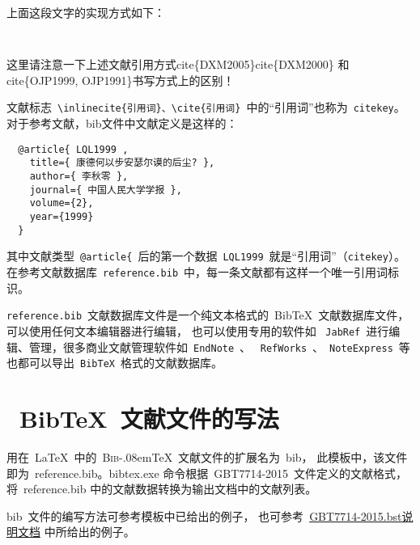 上面这段文字的实现方式如下：

\texttt{
}

这里请注意一下上述文献引用方式\cite{DXM2005}\cite{DXM2000}\cs cite\{DXM2005\}\cs cite\{DXM2000\}
和\cite{OJP1999,OJP1991}\cs cite\{OJP1999, OJP1991\}书写方式上的区别！

文献标志~\verb|\inlinecite{引用词}、\cite{引用词}|~中的“引用词”也称为~\verb|citekey|。
对于参考文献，bib文件中文献定义是这样的：
\begin{lstlisting}
  @article{ LQL1999 ,
    title={ 康德何以步安瑟尔谟的后尘? },
    author={ 李秋零 },
    journal={ 中国人民大学学报 },
    volume={2},
    year={1999}
  }
\end{lstlisting}

其中文献类型~\verb|@article{|~后的第一个数据~\verb|LQL1999|~就是“引用词”（\verb|citekey|）。
在参考文献数据库~\texttt{reference.bib}~中，每一条文献都有这样一个唯一引用词标识。

\texttt{reference.bib}~文献数据库文件是一个纯文本格式的~BibTeX~文献数据库文件，可以使用任何文本编辑器进行编辑，
也可以使用专用的软件如 ~\texttt{JabRef}~进行编辑、管理，很多商业文献管理软件如~\texttt{EndNote}~、
~\texttt{RefWorks}~、~\texttt{NoteExpress}~等也都可以导出~\texttt{BibTeX}~格式的文献数据库。

\section{~BibTeX~文献文件的写法}

用在~\LaTeX~中的~\textsc{Bib}\kern-.08em\TeX~文献文件的扩展名为~bib，
此模板中，该文件即为~reference.bib。bibtex.exe 命令根据~GBT7714-2015~文件定义的文献格式，
将~reference.bib 中的文献数据转换为输出文档中的文献列表。

bib~文件的编写方法可参考模板中已给出的例子，
也可参考~\href{http://bbs.ctex.org/attachment.php?aid=MTk3OTd8NjY1ODc5OGV8MTMyNTY0MTEyMnxhZGZkYWpsa0I2RGZwNDR5Z1lyeStjb1dKRS8rTnJub3lvT2FkNDNJbHl1UWVkVQ\%3D\%3D}{GBT7714-2015.bst说明文档} 中所给出的例子。


